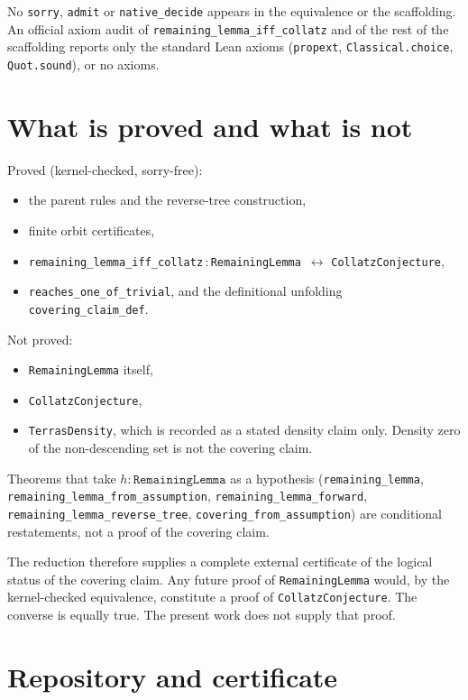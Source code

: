 \documentclass[11pt]{article}
\begin{document}
No \texttt{sorry}, \texttt{admit} or \texttt{native\_decide} appears in the equivalence or the scaffolding. An official axiom audit of \texttt{remaining\_lemma\_iff\_collatz} and of the rest of the scaffolding reports only the standard Lean axioms (\texttt{propext}, \texttt{Classical.choice}, \texttt{Quot.sound}), or no axioms.

\section{What is proved and what is not}

Proved (kernel-checked, sorry-free):
\begin{itemize}
\item the parent rules and the reverse-tree construction,
\item finite orbit certificates,
\item \texttt{remaining\_lemma\_iff\_collatz}\,:\,\texttt{RemainingLemma}\ $\leftrightarrow$ \texttt{CollatzConjecture},
\item \texttt{reaches\_one\_of\_trivial}, and the definitional unfolding \texttt{covering\_claim\_def}.
\end{itemize}

Not proved:
\begin{itemize}
\item \texttt{RemainingLemma} itself,
\item \texttt{CollatzConjecture},
\item \texttt{TerrasDensity}, which is recorded as a stated density claim only. Density zero of the non-descending set is not the covering claim.
\end{itemize}

Theorems that take $h:\texttt{RemainingLemma}$ as a hypothesis (\texttt{remaining\_lemma}, \texttt{remaining\_lemma\_from\_assumption}, \texttt{remaining\_lemma\_forward}, \texttt{remaining\_lemma\_reverse\_tree}, \texttt{covering\_from\_assumption}) are conditional restatements, not a proof of the covering claim.

The reduction therefore supplies a complete external certificate of the logical status of the covering claim. Any future proof of \texttt{RemainingLemma} would, by the kernel-checked equivalence, constitute a proof of \texttt{CollatzConjecture}. The converse is equally true. The present work does not supply that proof.

\section{Repository and certificate}
\end{document}
